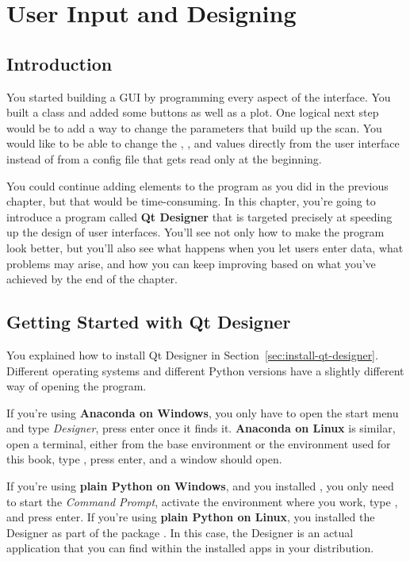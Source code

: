 \chapter{User Input and Designing}\label{ch:user-input-designer}

\section{Introduction}\label{sec:user-input-introduction}
You started building a GUI by programming every aspect of the interface. You built a  class and added some buttons as well as a plot. One logical next step would be to add a way to change the parameters that build up the scan. You would like to be able to change the , , and  values directly from the user interface instead of from a config file that gets read only at the beginning.

You could continue adding elements to the program as you did in the previous chapter, but that would be time-consuming. In this chapter, you're going to introduce a program called \textbf{Qt Designer} that is targeted precisely at speeding up the design of user interfaces. You'll see not only how to make the program look better, but you'll also see what happens when you let users enter data, what problems may arise, and how you can keep improving based on what you've achieved by the end of the chapter.

\section{Getting Started with Qt Designer}\label{sec:getting-started-with-qt-designer}
You explained how to install Qt Designer in Section~\ref{sec:install-qt-designer}. Different operating systems and different Python versions have a slightly different way of opening the program.

If you're using \textbf{Anaconda on Windows}, you only have to open the start menu and type \textit{Designer}, press \py{}enter once it finds it. \textbf{Anaconda on Linux} is similar, open a terminal, either from the base environment or the environment used for this book, type , press enter, and a window should open.

If you're using \textbf{plain Python on Windows}, and you installed , you only need to start the \emph{Command Prompt}, activate the environment where you work, type , and press enter. If you're using \textbf{plain Python on Linux}, you installed the Designer as part of the package . In this case, the Designer is an actual application that you can find within the installed apps in your distribution.

